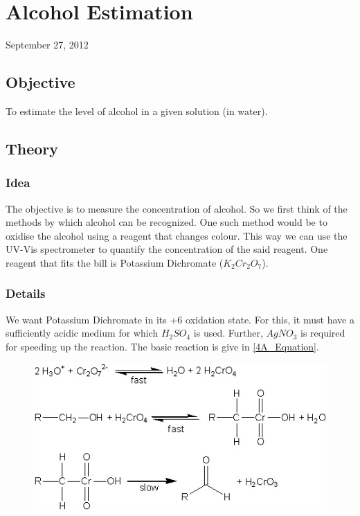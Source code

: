 \chapter{Alcohol Estimation}
\begin{flushright}
September 27, 2012
\end{flushright}
\section{Objective}
To estimate the level of alcohol in a given solution (in water).

\section{Theory}
\subsection{Idea}
	The objective is to measure the concentration of alcohol. So we first think of the methods by which alcohol can be recognized. One such method would be to oxidise the alcohol using a reagent that changes colour. This way we can use the UV-Vis spectrometer to quantify the concentration of the said reagent. One reagent that fits the bill is Potassium Dichromate ($K_{2}Cr_{2}O_{7}$).
\subsection{Details}
	We want Potassium Dichromate in its +6 oxidation state. For this, it must have a sufficiently acidic medium for which $H_{2}SO_{4}$ is used. Further, $AgNO_{3}$ is required for speeding up the reaction. The basic reaction is give in \autoref{4A_Equation}.

	\begin{figure}[bth]
		\begin{center}
			\includegraphics[width=1.0\linewidth]{gfx/4A}
		\end{center}
	\caption[Oxidation of Alcohol]{\label{4A_Equation}}
	\end{figure}


